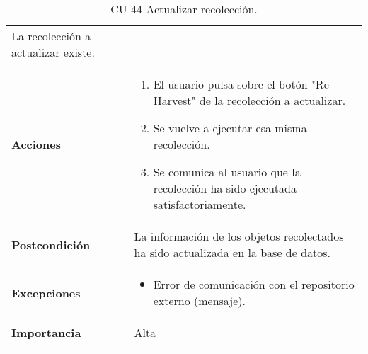 \begin{longtable}[]{@{}ll@{}}
\begin{minipage}[t]{0.72\columnwidth}
La recolección a actualizar existe.\strut
\end{minipage}\tabularnewline
\begin{minipage}[t]{0.22\columnwidth}\raggedright
\textbf{Acciones}\strut
\end{minipage} & \begin{minipage}[t]{0.72\columnwidth}\raggedright
\begin{enumerate}
\def\labelenumi{\arabic{enumi}.}
\tightlist
\item
  El usuario pulsa sobre el botón "Re-Harvest" de la recolección a
  actualizar.
\item
  Se vuelve a ejecutar esa misma recolección.
\item
  Se comunica al usuario que la recolección ha sido ejecutada
  satisfactoriamente.
\end{enumerate}\strut
\end{minipage}\tabularnewline
\begin{minipage}[t]{0.22\columnwidth}\raggedright
\textbf{Postcondición}\strut
\end{minipage} & \begin{minipage}[t]{0.72\columnwidth}\raggedright
La información de los objetos recolectados ha sido actualizada en la
base de datos.\strut
\end{minipage}\tabularnewline
\begin{minipage}[t]{0.22\columnwidth}\raggedright
\textbf{Excepciones}\strut
\end{minipage} & \begin{minipage}[t]{0.72\columnwidth}\raggedright
\begin{itemize}
\tightlist
\item
  Error de comunicación con el repositorio externo (mensaje).
\end{itemize}\strut
\end{minipage}\tabularnewline
\begin{minipage}[t]{0.22\columnwidth}\raggedright
\textbf{Importancia}\strut
\end{minipage} & \begin{minipage}[t]{0.72\columnwidth}\raggedright
Alta\strut
\end{minipage}\tabularnewline
\bottomrule
\caption{CU-44 Actualizar recolección.}
\end{longtable}

